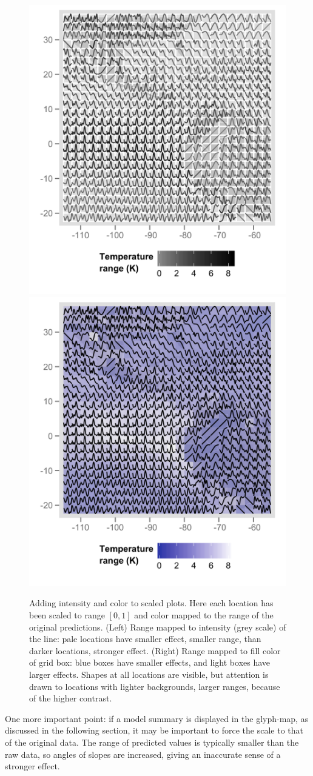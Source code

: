 \documentclass[oneside]{article}
\begin{document}
\begin{figure}[htbp]
 \centering
 \includegraphics[width=0.5\linewidth]{month-rescale01-col}%
 \includegraphics[width=0.5\linewidth]{month-rescale01-fill}
 \caption{Adding intensity and color to scaled plots. Here each location has been scaled to range $[0, 1]$ and color mapped to the range of the original predictions. (Left) Range mapped to intensity (grey scale) of the line: pale locations have smaller effect, smaller range, than darker locations, stronger effect. (Right) Range mapped to fill color of grid box: blue boxes have smaller effects, and light boxes have larger effects. Shapes at all locations are visible, but attention is drawn to locations with lighter backgrounds, larger ranges, because of the higher contrast.}
 \label{fig:scaling-col}
\end{figure}

One more important point: if a model summary is displayed in the glyph-map, as discussed in the following section, it may be important to force the scale to that of the original data. The range of predicted values is typically smaller than the raw data, so angles of slopes are increased, giving an inaccurate sense of a stronger effect.  
\end{document}
